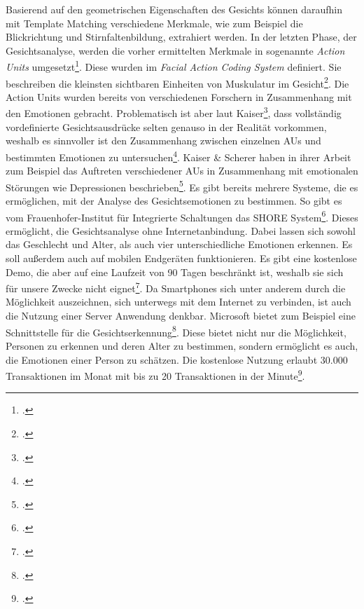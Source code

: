 Basierend auf den geometrischen Eigenschaften des Gesichts können daraufhin mit Template Matching verschiedene Merkmale, wie zum Beispiel die Blickrichtung und Stirnfaltenbildung, extrahiert werden. In der letzten Phase, der Gesichtsanalyse, werden die vorher ermittelten Merkmale in sogenannte \textit{Action Units} umgesetzt\footcite[Vgl. ][S.4 Z.17-21]{Can01}. Diese wurden im \textit{Facial Action Coding System} definiert. Sie beschreiben die kleinsten sichtbaren Einheiten von Muskulatur im Gesicht\footcite[Vgl. ][S.94 Z.9ff]{Kai98}. Die Action Units wurden bereits von verschiedenen Forschern in Zusammenhang mit den Emotionen gebracht. Problematisch ist aber laut Kaiser\footcite{Kai98}, dass vollständig vordefinierte Gesichtsausdrücke selten genauso in der Realität vorkommen, weshalb es sinnvoller ist den Zusammenhang zwischen einzelnen AUs und bestimmten Emotionen zu untersuchen\footcite[Vgl. ][S.94 Z.16-30]{Kai98}. Kaiser \& Scherer haben in ihrer Arbeit zum Beispiel das Auftreten verschiedener AUs in Zusammenhang mit emotionalen Störungen wie Depressionen beschrieben\footcite[Vgl. ][S.95 Table 6.3 Facial Action Units Predicted as Indicators of Selected Types of Affect Disorders]{Kai98}.
Es gibt bereits mehrere Systeme, die es ermöglichen, mit der Analyse des Gesichtsemotionen zu bestimmen. So gibt es vom Frauenhofer-Institut für Integrierte Schaltungen das SHORE System\footcite[Vgl. ][]{Fra18}. Dieses ermöglicht, die Gesichtsanalyse ohne Internetanbindung. Dabei lassen sich sowohl das Geschlecht und Alter, als auch vier unterschiedliche Emotionen erkennen. Es soll außerdem auch auf mobilen Endgeräten funktionieren. Es gibt eine kostenlose Demo, die aber auf eine Laufzeit von 90 Tagen beschränkt ist, weshalb sie sich für unsere Zwecke nicht eignet\footcite[Vgl. ][]{Fra18b}.\newline
Da Smartphones sich unter anderem durch die Möglichkeit auszeichnen, sich unterwegs mit dem Internet zu verbinden, ist auch die Nutzung einer Server Anwendung denkbar. Microsoft bietet zum Beispiel eine Schnittstelle für die Gesichtserkennung\footcite[Vgl. ][]{Mic18}. Diese bietet nicht nur die Möglichkeit, Personen zu erkennen und deren Alter zu bestimmen, sondern ermöglicht es auch, die Emotionen einer Person zu schätzen. Die kostenlose Nutzung erlaubt 30.000 Transaktionen im Monat mit bis zu 20 Transaktionen in der Minute\footcite[Vgl. ][]{Mic18b}.
